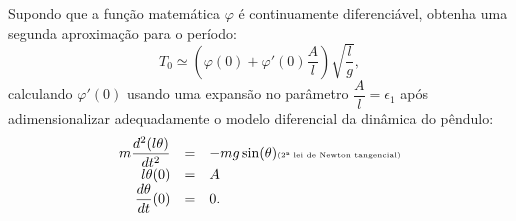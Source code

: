 \begin{exercise}
    Supondo que a função matemática \(\varphi\) é continuamente diferenciável, obtenha uma segunda aproximação para o período:
    \[T_{0} \simeq \left(\varphi(0) + \varphi'(0) \dfrac{A}{l}\right) \sqrt{\dfrac{l}{g}},\] calculando \(\varphi'(0)\) usando uma expansão no parâmetro \(\dfrac{A}{l} = \epsilon_{1}\) após adimensionalizar adequadamente o modelo diferencial da dinâmica do pêndulo:
    \[\begin{array}{rcl}
    m \dfrac{d^2(l\theta)}{dt^{2}} &=& -mg \sin(\theta) \mbox{\tiny (2\textordfeminine\ lei de Newton tangencial)} \\
    l\theta(0) &=& A \\
    \dfrac{d\theta}{dt}(0) &=& 0.
    \end{array}\]
\end{exercise}

